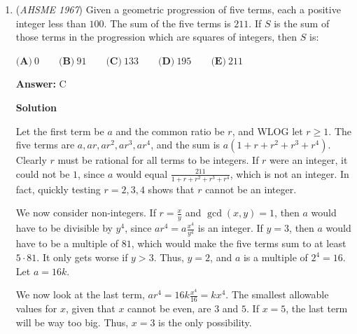 \begin{enumerate}
 By using Vieta again, we see that $(r-d)(r)(r+d)=\frac{15}{64}$. Substituting $r=\frac 3 4$ into this equation, we can now solve for $d$:\begin{align*}(\frac 3 4-d)(\frac 3 4)(\frac 3 4+d) &= \frac{15}{64} \\\frac 3 4(\frac 9{16}-d^2) &= \frac{15}{64} \\\frac 9{16}-d^2 &= \frac 5{16} \\d^2 &= \frac 4{16} = \frac 1 4 \\d &= \pm \frac 1 2\end{align*}
 Because we defined $d \geq 0$, $d=\frac 1 2$. Therefore, the difference between the largest and smallest roots, $r+d$ and $r-d$, is $2d=2 \cdot \frac 1 2 = \boxed{\textbf{(B) }1}$.

 


	\item (\textit{AHSME 1967}) Given a geometric progression of five terms, each a positive integer less than $100$.  The sum of the five terms is $211$.  If $S$ is the sum of those terms in the progression which are squares of integers, then $S$ is:


 $\textbf{(A)}\ 0\qquad \textbf{(B)}\ 91\qquad \textbf{(C)}\ 133\qquad \textbf{(D)}\ 195\qquad \textbf{(E)}\ 211$

 \textbf{Answer: }C



\textbf{Solution}

Let the first term be $a$ and the common ratio be $r$, and WLOG let $r \ge 1$.  The five terms are $a, ar, ar^2, ar^3, ar^4$, and the sum is $a(1 + r + r^2 + r^3 + r^4)$.  Clearly $r$ must be rational for all terms to be integers.  If $r$ were an integer, it could not be $1$, since $a$ would equal $\frac{211}{1 + r + r^2 + r^3 + r^4}$, which is not an integer.  In fact, quickly testing $r = 2, 3, 4$ shows that $r$ cannot be an integer.

 We now consider non-integers.  If $r = \frac{x}{y}$ and $\gcd(x, y) = 1$, then $a$ would have to be divisible by $y^4$, since $ar^4 = a\frac{x^4}{y^4}$ is an integer.  If $y = 3$, then $a$ would have to be a multiple of $81$, which would make the five terms sum to at least $5 \cdot 81$.  It only gets worse if $y > 3$.  Thus, $y = 2$, and $a$ is a multiple of $2^4 = 16$.  Let $a = 16k$.

 We now look at the last term, $ar^4 = 16k\frac{x^4}{16} = kx^4$.  The smallest allowable values for $x$, given that $x$ cannot be even, are $3$ and $5$.  If $x = 5$, the last term will be way too big.  Thus, $x = 3$ is the only possibility.


\end{enumerate}
